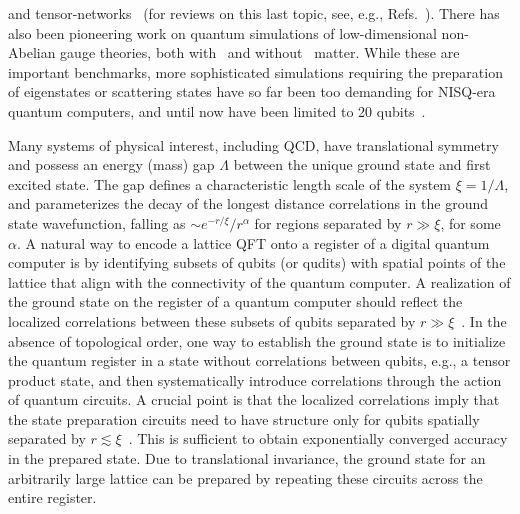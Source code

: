 \documentclass[aps, pra, onecolumn, tightenlines, letterpaper, amsmath, amssymb, preprintnumbers, floatfix, longbibliography, nofootinbib]{revtex4-2}
\begin{document}
and tensor-networks~\cite{Byrnes:2002nv,Banuls:2013jaa,Rico:2013qya,Buyens:2013yza,Kuhn:2014rha,Banuls:2015sta,Pichler:2015yqa,Buyens:2015tea,Banuls:2016lkq,Buyens:2016ecr,Buyens:2016hhu,Zapp:2017fcr,Ercolessi:2017jbi,Sala:2018dui,Funcke:2019zna,Magnifico:2019kyj,Butt:2019uul,Rigobello:2021fxw,Okuda:2022hsq,Honda:2022edn,Desaules:2023ghs,Angelides:2023bme,Belyansky:2023rgh} (for reviews on this last topic, see, e.g., Refs.~\cite{Banuls:2019rao,Banuls:2019bmf}).
There has also been pioneering work on quantum simulations of low-dimensional 
non-Abelian gauge theories, both with~\cite{Atas:2021ext,Atas:2022dqm,Farrell:2022vyh,Farrell:2022wyt,Ciavarella:2023mfc,Kuhn:2015zqa} 
and without~\cite{Klco:2019evd,Ciavarella:2021nmj,Ciavarella:2021lel,ARahman:2021ktn,Illa:2022jqb,Ciavarella:2022zhe,ARahman:2022tkr} matter.
While these are important benchmarks, more sophisticated simulations requiring the preparation of eigenstates or scattering states have so far been too demanding for 
NISQ-era quantum computers, and until now have been limited to 20 qubits~\cite{Kokail:2018eiw,Mildenberger:2022jqr}.





Many systems of physical interest, including QCD, 
have translational symmetry and possess an energy (mass) gap $\Lambda$ between the unique ground state and first excited state.
The  gap defines a characteristic length scale of the system $\xi = 1/\Lambda$, and parameterizes the decay of the longest distance 
correlations in the ground state wavefunction, falling as 
$\sim e^{- r/\xi}/r^\alpha$ for regions separated by $r\gg\xi$, for some $\alpha$.
A natural way to encode a lattice QFT onto a register of a digital quantum computer is by identifying subsets of qubits (or qudits) with spatial points of the lattice 
that align with the connectivity of the quantum computer.
A realization of the ground state on the register of a quantum computer
should reflect the localized correlations
between these subsets of 
qubits
separated by $r\gg\xi$~\cite{Klco:2019yrb,Klco:2020aud}.
In the absence of topological order, one way to establish the ground state is to initialize the quantum register in a 
state without correlations between qubits, e.g., a tensor product state,
and 
then systematically introduce correlations 
through the action of  quantum circuits.
A crucial point is that the localized correlations imply that the state preparation circuits need to have structure only for qubits spatially separated by $r \lesssim \xi$~\cite{Klco:2019yrb,Klco:2020aud}.
This is sufficient to obtain exponentially converged accuracy in the prepared state.
Due to translational invariance, the ground state for an arbitrarily large lattice can be prepared by repeating these circuits across the entire register.
\end{document}
